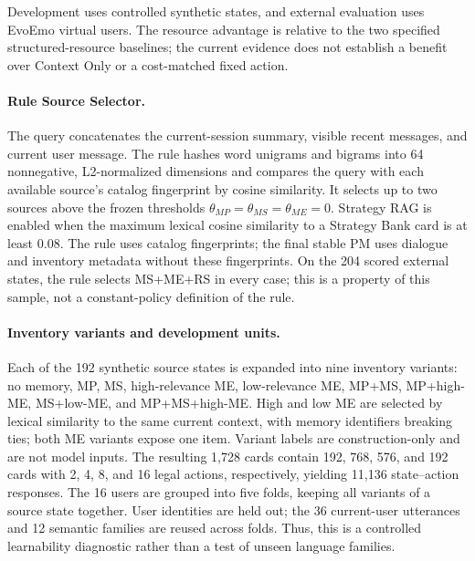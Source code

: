 
Development uses controlled synthetic states, and external evaluation uses
EvoEmo virtual users. The resource advantage is relative to the two specified
structured-resource baselines; the current evidence does not establish a
benefit over Context Only or a cost-matched fixed action.

\paragraph{Rule Source Selector.}
The query concatenates the current-session summary, visible recent messages,
and current user message. The rule hashes word unigrams and bigrams into
64 nonnegative, L2-normalized dimensions and compares the query with each
available source's catalog fingerprint by cosine similarity. It selects up
to two sources above the frozen thresholds
$\theta_{MP}=\theta_{MS}=\theta_{ME}=0$.
Strategy RAG is enabled when the maximum lexical cosine similarity to a
Strategy Bank card is at least $0.08$. The rule uses catalog fingerprints;
the final stable PM uses dialogue and inventory metadata without these
fingerprints. On the 204 scored external states, the rule selects MS+ME+RS
in every case; this is a property of this sample, not a constant-policy
definition of the rule.

\paragraph{Inventory variants and development units.}
Each of the 192 synthetic source states is expanded into nine inventory
variants: no memory, MP, MS, high-relevance ME, low-relevance ME, MP+MS,
MP+high-ME, MS+low-ME, and MP+MS+high-ME. High and low ME are selected by
lexical similarity to the same current context, with memory identifiers
breaking ties; both ME variants expose one item. Variant labels are
construction-only and are not model inputs. The resulting 1,728 cards
contain 192, 768, 576, and 192 cards with 2, 4, 8, and 16 legal actions,
respectively, yielding 11,136 state--action responses. The 16 users are
grouped into five folds, keeping all variants of a source state together.
User identities are held out; the 36 current-user utterances and 12 semantic
families are reused across folds. Thus, this is a controlled learnability
diagnostic rather than a test of unseen language families.

